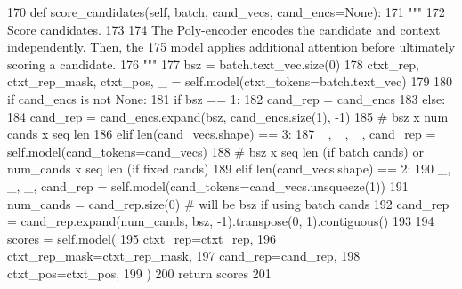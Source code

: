 \begin{DoxyCode}
170     \textcolor{keyword}{def }score\_candidates(self, batch, cand\_vecs, cand\_encs=None):
171         \textcolor{stringliteral}{"""}
172 \textcolor{stringliteral}{        Score candidates.}
173 \textcolor{stringliteral}{}
174 \textcolor{stringliteral}{        The Poly-encoder encodes the candidate and context independently. Then, the}
175 \textcolor{stringliteral}{        model applies additional attention before ultimately scoring a candidate.}
176 \textcolor{stringliteral}{        """}
177         bsz = batch.text\_vec.size(0)
178         ctxt\_rep, ctxt\_rep\_mask, ctxt\_pos, \_ = self.model(ctxt\_tokens=batch.text\_vec)
179 
180         \textcolor{keywordflow}{if} cand\_encs \textcolor{keywordflow}{is} \textcolor{keywordflow}{not} \textcolor{keywordtype}{None}:
181             \textcolor{keywordflow}{if} bsz == 1:
182                 cand\_rep = cand\_encs
183             \textcolor{keywordflow}{else}:
184                 cand\_rep = cand\_encs.expand(bsz, cand\_encs.size(1), -1)
185         \textcolor{comment}{# bsz x num cands x seq len}
186         \textcolor{keywordflow}{elif} len(cand\_vecs.shape) == 3:
187             \_, \_, \_, cand\_rep = self.model(cand\_tokens=cand\_vecs)
188         \textcolor{comment}{# bsz x seq len (if batch cands) or num\_cands x seq len (if fixed cands)}
189         \textcolor{keywordflow}{elif} len(cand\_vecs.shape) == 2:
190             \_, \_, \_, cand\_rep = self.model(cand\_tokens=cand\_vecs.unsqueeze(1))
191             num\_cands = cand\_rep.size(0)  \textcolor{comment}{# will be bsz if using batch cands}
192             cand\_rep = cand\_rep.expand(num\_cands, bsz, -1).transpose(0, 1).contiguous()
193 
194         scores = self.model(
195             ctxt\_rep=ctxt\_rep,
196             ctxt\_rep\_mask=ctxt\_rep\_mask,
197             cand\_rep=cand\_rep,
198             ctxt\_pos=ctxt\_pos,
199         )
200         \textcolor{keywordflow}{return} scores
201 
\end{DoxyCode}
\mbox{\label{classparlai_1_1agents_1_1transformer_1_1polyencoder_1_1PolyencoderAgent_a02cea5573a5135f5a7201c49296abded}} 
